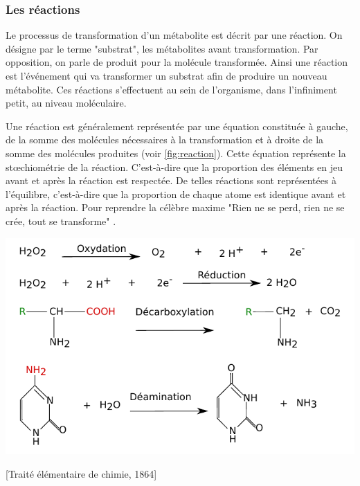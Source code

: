 \begin{refsegment}
	\subsubsection{Les réactions}
	Le processus de transformation d’un métabolite est décrit par une réaction. On désigne par le terme "substrat", les métabolites avant transformation. Par opposition, on parle de produit pour la molécule transformée. Ainsi une réaction est l'événement qui va transformer un substrat afin de produire un nouveau métabolite. Ces réactions s'effectuent au sein de l'organisme, dans l'infiniment petit, au niveau moléculaire.
    
    Une réaction est généralement représentée par une équation constituée à gauche, de la somme des molécules nécessaires à la transformation et à droite de la somme des molécules produites (voir \cref{fig:reaction}). Cette équation  représente la stœchiométrie de la réaction. C’est-à-dire que la proportion des éléments en jeu avant et après la réaction est respectée. De telles réactions sont représentées à l'équilibre, c'est-à-dire que la proportion de chaque atome est identique avant et après la réaction. Pour reprendre la célèbre maxime "Rien ne se perd, rien ne se crée, tout se transforme" .
    
    \begin{shadedfigure}[H]
        \centering
        \includegraphics[width=\textwidth]{img/equation_reaction.pdf}
        \caption{Représentation de réaction sous leur forme "équation-bilan" .}
        \label{fig:reaction}
    \end{shadedfigure}
    
    [Traité élémentaire de chimie, 1864]
    

\end{refsegment}
